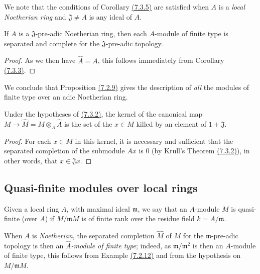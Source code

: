 We note that the conditions of Corollary \hyperref[0.7.3.5]{(7.3.5)} are satisfied
when $A$ is a {\em local Noetherian ring} and $\mathfrak{J}\neq A$ is any ideal of $A$.

\begin{cor}[7.3.6]
\label{0.7.3.6}
If $A$ is a $\mathfrak{J}$-pre-adic Noetherian ring, then each $A$-module of finite type
is separated and complete for the $\mathfrak{J}$-pre-adic topology.
\end{cor}

\begin{proof}
\label{proof-0.7.3.6}
As we then have $\widehat{A}=A$, this follows immediately from
Corollary \hyperref[0.7.3.3]{(7.3.3)}.
\end{proof}

We conclude that Proposition \hyperref[0.7.2.9]{(7.2.9)} gives the description of
{\em all} the modules of finite type over an adic Noetherian ring.

\begin{cor}[7.3.7]
\label{0.7.3.7}
Under the hypotheses of \hyperref[0.7.3.2]{(7.3.2)}, the kernel of the canonical map
$M\to\widehat{M}=M\otimes_A\widehat{A}$ is the set of the $x\in M$ killed by an element of
$1+\mathfrak{J}$.
\end{cor}

\begin{proof}
\label{proof-0.7.3.7}
For each $x\in M$ in this kernel, it is necessary and sufficient that the separated
completion of the submodule $Ax$ is $0$
(by Krull's Theorem \hyperref[0.7.3.2]{(7.3.2)}), in other words, that
$x\in\mathfrak{J}x$.
\end{proof}

\subsection{Quasi-finite modules over local rings}
\label{subsection-quasi-finite-modules-over-local-rings}

\begin{defn}[7.4.1]
\label{0.7.4.1}
Given a local ring $A$, with maximal ideal $\mathfrak{m}$, we say that an $A$-module $M$
is quasi-finite (over $A$) if $M/\mathfrak{m}M$ is of finite rank over the residue field
$k=A/\mathfrak{m}$.
\end{defn}

When $A$ is {\em Noetherian}, the separated completion $\widehat{M}$ of $M$ for the
$\mathfrak{m}$-pre-adic topology is then an {\em $\widehat{A}$-module of finite type};
indeed, as $\mathfrak{m}/\mathfrak{m}^2$ is then an $A$-module of finite type, this follows
from Example \hyperref[0.7.2.12]{(7.2.12)} and from the hypothesis on $M/\mathfrak{m}M$.


